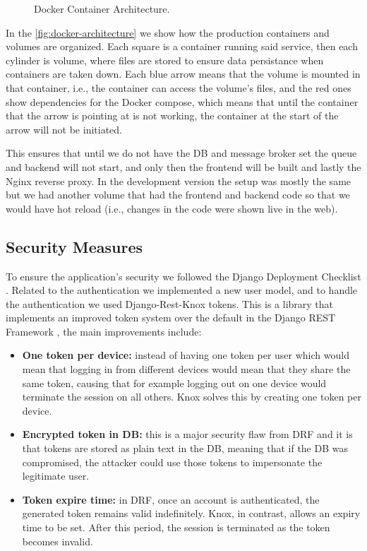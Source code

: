 \begin{figure}[!htbp]
    \centering
    
    \caption{Docker Container Architecture.}
    \label{fig:docker-architecture}
\end{figure}

In the \autoref{fig:docker-architecture} we show how the production containers and volumes are organized.
Each square is a container running said service,
then each cylinder is volume, where files are stored to ensure data persistance when containers are taken down.
Each blue arrow means that the volume is mounted in that container, i.e., the container can access the volume's files,
and the red ones show dependencies for the Docker compose,
which means that until the container that the arrow is pointing at is not working,
the container at the start of the arrow will not be initiated.

This ensures that until we do not have the \ac{DB} and message broker set
the queue and backend will not start,
and only then the frontend will be built
and lastly the Nginx reverse proxy.
In the development version the setup was mostly the same
but we had another volume that had the frontend and backend code
so that we would have hot reload (i.e., changes in the code were shown live in the web).

\subsection{Security Measures}

To ensure the application's security we followed the Django Deployment Checklist \autocite{DeploymentChecklistDjango}.
Related to the authentication we implemented a new user model,
and to handle the authentication we used Django-Rest-Knox \autocite{DjangoRestKnox} tokens.
This is a library that implements an improved token system over the default in the Django REST Framework \autocite{DjangoRESTFramework},
the main improvements include:
\begin{itemize}
  \item \textbf{One token per device:}
    instead of having one token per user
    which would mean that logging in from different devices
    would mean that they share the same token,
    causing that for example
    logging out on one device would terminate the session on all others.
    Knox solves this by creating one token per device.

  \item \textbf{Encrypted token in \ac{DB}:}
    this is a major security flaw from \ac{DRF}
    and it is that tokens are stored as plain text in the \ac{DB},
    meaning that if the \ac{DB} was compromised,
    the attacker could use those tokens to impersonate the legitimate user.

  \item \textbf{Token expire time:}
    in \ac{DRF}, once an account is authenticated, the generated token remains valid indefinitely.
    Knox, in contrast, allows an expiry time to be set.
    After this period, the session is terminated as the token becomes invalid.
\end{itemize}

